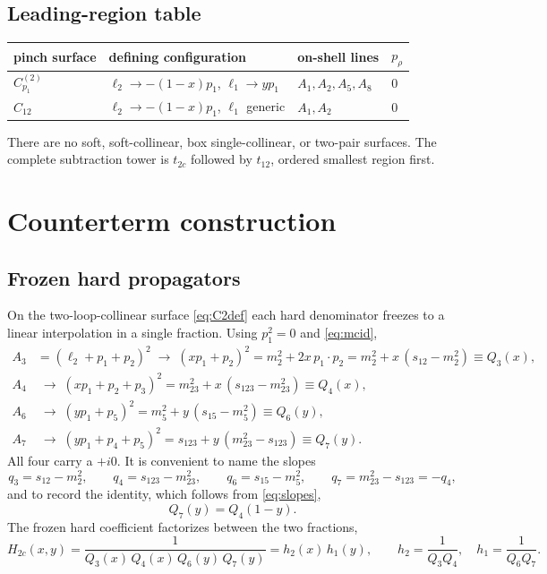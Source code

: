 \documentclass[11pt]{article}
\begin{document}
\subsection{Leading-region table}

\begin{center}
\begin{tabular}{llll}
\toprule
pinch surface & defining configuration & on-shell lines & $p_\rho$\\
\midrule
$C^{(2)}_{p_1}$ & $\ell_2\to-(1-x)p_1$, $\ell_1\to y p_1$ & $A_1,A_2,A_5,A_8$ & $0$\\[2pt]
$C_{12}$ & $\ell_2\to-(1-x)p_1$, $\ell_1$ generic & $A_1,A_2$ & $0$\\
\bottomrule
\end{tabular}
\end{center}

\noindent
There are no soft, soft-collinear, box single-collinear, or two-pair surfaces. The complete
subtraction tower is $t_{2c}$ followed by $t_{12}$, ordered smallest region first.

\section{Counterterm construction}
\label{sec:CT}

\subsection{Frozen hard propagators}

On the two-loop-collinear surface \eqref{eq:C2def} each hard denominator freezes to a linear
interpolation in a single fraction. Using $p_1^2=0$ and \eqref{eq:mcid},
\begin{equation}
\begin{aligned}
A_3&=(\ell_2+p_1+p_2)^2\;\longrightarrow\;(x p_1+p_2)^2=m_2^2+2x\,p_1\!\cdot\! p_2
= m_2^2+x\,(s_{12}-m_2^2)\equiv Q_3(x),\\
A_4&\;\longrightarrow\;(x p_1+p_2+p_3)^2 = m_{23}^2+x\,(s_{123}-m_{23}^2)\equiv Q_4(x),\\
A_6&\;\longrightarrow\;(y p_1+p_5)^2 = m_5^2+y\,(s_{15}-m_5^2)\equiv Q_6(y),\\
A_7&\;\longrightarrow\;(y p_1+p_4+p_5)^2 = s_{123}+y\,(m_{23}^2-s_{123})\equiv Q_7(y) .
\end{aligned}
\label{eq:Qdefs}
\end{equation}
All four carry a $+i0$. It is convenient to name the slopes
\begin{equation}
q_3=s_{12}-m_2^2,\qquad
q_4=s_{123}-m_{23}^2,\qquad
q_6=s_{15}-m_5^2,\qquad
q_7=m_{23}^2-s_{123}=-q_4 ,
\label{eq:slopes}
\end{equation}
and to record the identity, which follows from \eqref{eq:slopes},
\begin{equation}
Q_7(y)=Q_4(1-y) .
\label{eq:Q7Q4}
\end{equation}
The frozen hard coefficient factorizes between the two fractions,
\begin{equation}
H_{2c}(x,y)=\frac{1}{Q_3(x)\,Q_4(x)\,Q_6(y)\,Q_7(y)}
= h_2(x)\,h_1(y),
\qquad
h_2=\frac{1}{Q_3Q_4},\quad h_1=\frac{1}{Q_6Q_7} .
\label{eq:H2c}
\end{equation}
\end{document}
